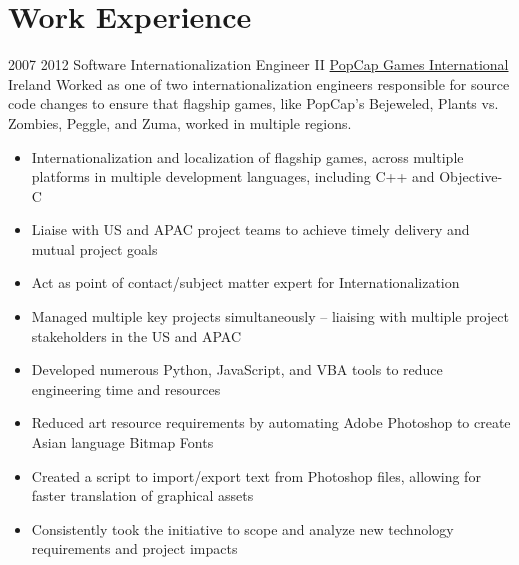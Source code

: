 \documentclass[a4paper]{twentysecondcv} %
\begin{document}
\newpage
\makeprofiletwo

\section{Work Experience}
\begin{twenty}
\twentyitem
      {2007} %
  {2012} %
    {Software Internationalization Engineer II} %
    {\href{https://www.popcap.com/}{PopCap Games International}} %
    {Ireland} %
    {Worked as one of two internationalization engineers responsible for source code changes to ensure that flagship games, like PopCap's Bejeweled, Plants vs. Zombies, Peggle, and Zuma, worked in multiple regions.} %
  {\begin{itemize}
    \item Internationalization and localization of flagship games, across multiple platforms in multiple development languages, including C++ and Objective-C
    \item Liaise with US and APAC project teams to achieve timely delivery and mutual project goals
    \item Act as point of contact/subject matter expert for Internationalization
  \end{itemize}
  } %
  {\begin{itemize}
    \item Managed multiple key projects simultaneously – liaising with multiple project stakeholders in the US and APAC
    \item Developed numerous Python, JavaScript, and VBA tools to reduce engineering time and resources
    \item Reduced art resource requirements by automating Adobe Photoshop to create Asian language Bitmap Fonts
    \item Created a script to import/export text from Photoshop files, allowing for faster translation of graphical assets
    \item Consistently took the initiative to scope and analyze new technology requirements and project impacts
  \end{itemize}
  } %

\end{twenty}

\vspace{0.75\baselineskip}%
\end{document}
